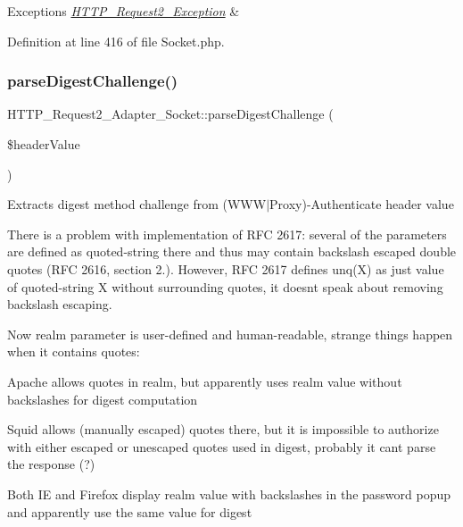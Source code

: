 \begin{DoxyExceptions}{Exceptions}
{\em \hyperlink{classHTTP__Request2__Exception}{H\+T\+T\+P\+\_\+\+Request2\+\_\+\+Exception}} & \\
\hline
\end{DoxyExceptions}


Definition at line 416 of file Socket.\+php.

\hypertarget{classHTTP__Request2__Adapter__Socket_a271d3c7e7ce64e2acc6f560187c8a7cb}{}\label{classHTTP__Request2__Adapter__Socket_a271d3c7e7ce64e2acc6f560187c8a7cb} 
\subsubsection{\texorpdfstring{parse\+Digest\+Challenge()}{parseDigestChallenge()}}
{\footnotesize\ttfamily H\+T\+T\+P\+\_\+\+Request2\+\_\+\+Adapter\+\_\+\+Socket\+::parse\+Digest\+Challenge (\begin{DoxyParamCaption}\item[{}]{\$header\+Value }\end{DoxyParamCaption})\hspace{0.3cm}{\ttfamily [protected]}}

Extracts digest method challenge from (W\+W\+W$\vert$\+Proxy)-\/\+Authenticate header value

There is a problem with implementation of R\+FC 2617\+: several of the parameters are defined as quoted-\/string there and thus may contain backslash escaped double quotes (R\+FC 2616, section 2.). However, R\+FC 2617 defines unq(\+X) as just value of quoted-\/string X without surrounding quotes, it doesn\textquotesingle{}t speak about removing backslash escaping.

Now realm parameter is user-\/defined and human-\/readable, strange things happen when it contains quotes\+:
\begin{DoxyItemize}
\item Apache allows quotes in realm, but apparently uses realm value without backslashes for digest computation
\item Squid allows (manually escaped) quotes there, but it is impossible to authorize with either escaped or unescaped quotes used in digest, probably it can\textquotesingle{}t parse the response (?)
\item Both IE and Firefox display realm value with backslashes in the password popup and apparently use the same value for digest
\end{DoxyItemize}

